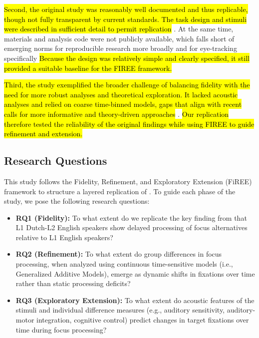 \hl{Second, the original study was reasonably well documented and thus replicable, though not fully transparent by current standards. The task design and stimuli 
were described in sufficient detail to permit replication} \parencite{mcmanus2024}. At the same time, materials and analysis code were not publicly available, which 
falls short of emerging norms for reproducible research more broadly \parencite{goodman2016reproducibility} and for eye-tracking specifically \parencite{godfroid2025reporting,AOW} \hl{Because the design was relatively simple and clearly specified, it still provided a suitable baseline for the 
FIREE framework.} 

\hl{Third, the study exemplified the broader challenge of balancing fidelity with the need for more robust analyses and theoretical exploration. It lacked 
acoustic analyses and relied on coarse time-binned models, gaps that align with recent calls for more informative and theory-driven approaches} \parencite{xie2023adaptive}. \hl{Our replication therefore tested the reliability of the 
original findings while using FIREE to guide refinement and extension.}

\subsection{Research Questions}

This study follows the Fidelity, Refinement, and Exploratory Extension (FiREE) framework to structure a layered replication of \cite{ge2021a}. To guide each phase of the study, we pose the following research questions:

\begin{itemize}
    \item \textbf{RQ1 (Fidelity):} To what extent do we replicate the key finding from \cite{ge2021a} that L1 Dutch-L2 English speakers show delayed processing of focus alternatives relative to L1 English speakers?
    
    \item \textbf{RQ2 (Refinement):} To what extent do group differences in focus processing, when analyzed using continuous time-sensitive models (i.e., Generalized Additive Models), emerge as dynamic shifts in fixations over time rather than static processing deficits?
    
    \item \textbf{RQ3 (Exploratory Extension):} To what extent do acoustic features of the stimuli and individual difference measures (e.g., auditory sensitivity, auditory-motor integration, cognitive control) predict changes in target fixations over time during focus processing?
\end{itemize}
